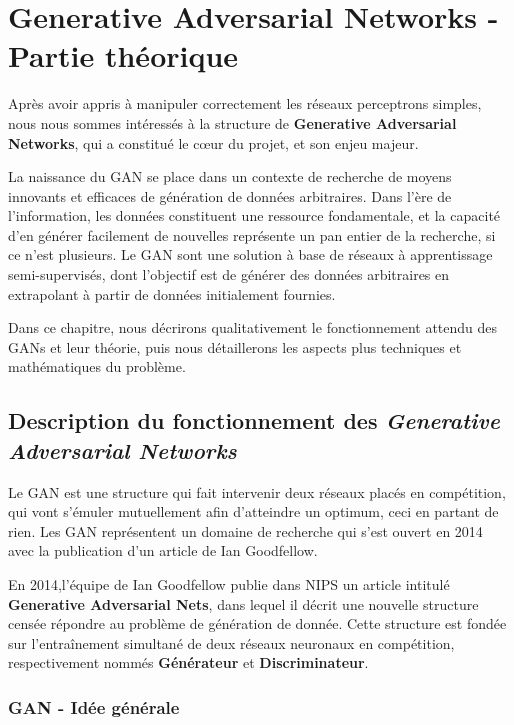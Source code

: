 \chapter{Generative Adversarial Networks - Partie théorique}

Après avoir appris à manipuler correctement les réseaux perceptrons simples, nous nous sommes intéressés à la structure de \textbf{Generative Adversarial Networks}, qui a constitué le cœur du projet, et son enjeu majeur. 

La naissance du GAN se place dans un contexte de recherche de moyens innovants et efficaces de génération de données arbitraires. Dans l'ère de l'information, les données constituent une ressource fondamentale, et la capacité d'en générer facilement de nouvelles représente un pan entier de la recherche, si ce n'est plusieurs. Le GAN sont une solution à base de réseaux à apprentissage semi-supervisés, dont l'objectif est de générer des données arbitraires en extrapolant à partir de données initialement fournies.

Dans ce chapitre, nous décrirons qualitativement le fonctionnement attendu des GANs et leur théorie, puis nous détaillerons les aspects plus techniques et mathématiques du problème. 

\section{Description du fonctionnement des \textit{Generative Adversarial Networks}}

Le GAN est une structure qui fait intervenir deux réseaux placés en compétition, qui vont s'émuler mutuellement afin d'atteindre un optimum, ceci en partant de rien. Les GAN représentent un domaine de recherche qui s'est ouvert en 2014 avec la publication d'un article de Ian Goodfellow.

En 2014,l'équipe de Ian Goodfellow publie dans NIPS un article intitulé \textbf{Generative Adversarial Nets}, dans lequel il décrit une nouvelle structure censée répondre au problème de génération de donnée. Cette structure est fondée sur l'entraînement simultané de deux réseaux neuronaux en compétition, respectivement nommés \textbf{Générateur} et \textbf{Discriminateur}.  


\subsection{GAN - Idée générale}

